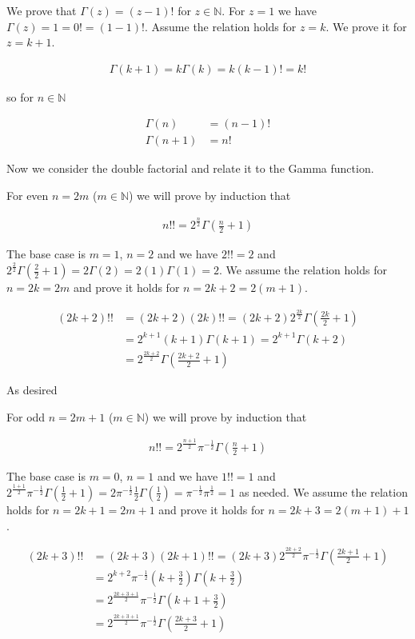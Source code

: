 \documentclass[12pt]{article}
\begin{document}
We prove that $\Gamma(z) = (z-1)!$ for $z \in \mathbb{N}$. For $z=1$ we have $\Gamma(z) = 1 = 0! = (1-1)!$. Assume the relation holds for $z=k$. We prove it for $z=k+1$.

\begin{align}
\Gamma(k+1) = k\Gamma(k) = k(k-1)! = k!
\end{align}

so for $n\in\mathbb{N}$

\begin{align}
\Gamma(n) &= (n-1)!\\
\Gamma(n+1) &= n!
\end{align}

Now we consider the double factorial and relate it to the Gamma function. 

For even $n=2m$ ($m\in \mathbb{N}$) we will prove by induction that

\begin{align}
n!! = 2^{\frac{n}{2}}\Gamma\left(\frac{n}{2}+1\right)
\end{align}

The base case is $m=1$, $n=2$ and we have $2!! = 2$ and $2^{\frac{2}{2}}\Gamma\left(\frac{2}{2}+1\right) = 2\Gamma(2) = 2(1)\Gamma(1) = 2$. We assume the relation holds for $n=2k = 2m$ and prove it holds for $n=2k+2 = 2(m+1)$.

\begin{align}
(2k+2)!! &= (2k+2)(2k)!! = (2k+2)2^{\frac{2k}{2}}\Gamma\left(\frac{2k}{2}+1\right)\\
&= 2^{k+1}(k+1)\Gamma(k+1) = 2^{k+1}\Gamma(k+2)\\
&= 2^{\frac{2k+2}{2}}\Gamma\left(\frac{2k+2}{2}+1\right)
\end{align}

As desired

For odd $n=2m+1$ ($m\in\mathbb{N}$) we will prove by induction that

\begin{align}
n!! = 2^{\frac{n+1}{2}}\pi^{-\frac{1}{2}}\Gamma\left(\frac{n}{2}+1\right)
\end{align}

The base case is $m=0$, $n=1$ and we have $1!! = 1$ and $2^{\frac{1+1}{2}}\pi^{-\frac{1}{2}}\Gamma\left(\frac{1}{2} + 1\right) = 2 \pi^{-\frac{1}{2}} \frac{1}{2}\Gamma\left(\frac{1}{2}\right) = \pi^{-\frac{1}{2}}\pi^{\frac{1}{2}} = 1$ as needed. We assume the relation holds for $n=2k+1 = 2m+1$ and prove it holds for $n=2k+3 = 2(m+1)+1$.

\begin{align}
(2k+3)!! &= (2k+3)(2k+1)!! = (2k+3)2^{\frac{2k+2}{2}}\pi^{-\frac{1}{2}} \Gamma\left(\frac{2k+1}{2}+1\right)\\
&= 2^{k+2}\pi^{-\frac{1}{2}}\left(k+\frac{3}{2}\right)\Gamma\left(k+\frac{3}{2}\right)\\
&= 2^{\frac{2k+3+1}{2}} \pi^{-\frac{1}{2}} \Gamma\left(k+1+\frac{3}{2}\right)\\
&= 2^{\frac{2k+3+1}{2}} \pi^{-\frac{1}{2}} \Gamma\left(\frac{2k+3}{2} + 1\right)
\end{align}
\end{document}
